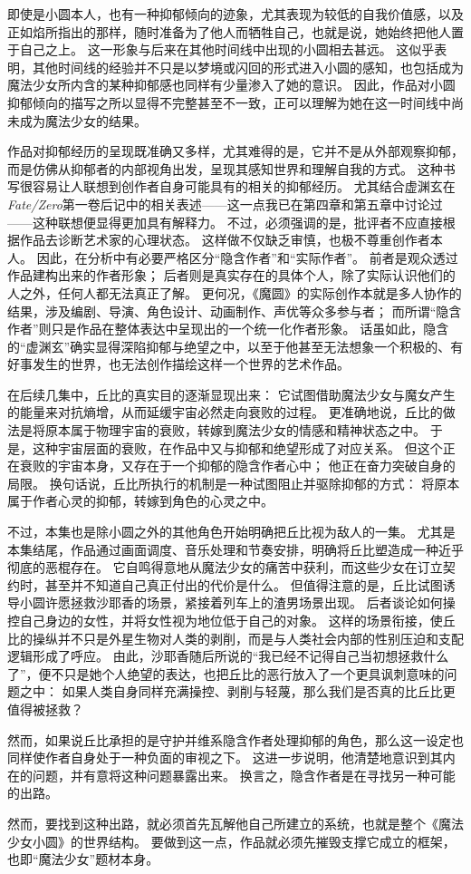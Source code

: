 即使是小圆本人，也有一种抑郁倾向的迹象，尤其表现为较低的自我价值感，以及正如焰所指出的那样，随时准备为了他人而牺牲自己，也就是说，她始终把他人置于自己之上。
这一形象与后来在其他时间线中出现的小圆相去甚远。
这似乎表明，其他时间线的经验并不只是以梦境或闪回的形式进入小圆的感知，也包括成为魔法少女所内含的某种抑郁感也同样有少量渗入了她的意识。
因此，作品对小圆抑郁倾向的描写之所以显得不完整甚至不一致，正可以理解为她在这一时间线中尚未成为魔法少女的结果。

作品对抑郁经历的呈现既准确又多样，尤其难得的是，它并不是从外部观察抑郁，而是仿佛从抑郁者的内部视角出发，呈现其感知世界和理解自我的方式。
这种书写很容易让人联想到创作者自身可能具有的相关的抑郁经历。
尤其结合虚渊玄在\emph{Fate/Zero}第一卷后记中的相关表述——这一点我已在第四章和第五章中讨论过——这种联想便显得更加具有解释力。
不过，必须强调的是，批评者不应直接根据作品去诊断艺术家的心理状态。
这样做不仅缺乏审慎，也极不尊重创作者本人。
因此，在分析中有必要严格区分“隐含作者”和“实际作者”。
前者是观众透过作品建构出来的作者形象；
后者则是真实存在的具体个人，除了实际认识他们的人之外，任何人都无法真正了解。
更何况，《魔圆》的实际创作本就是多人协作的结果，涉及编剧、导演、角色设计、动画制作、声优等众多参与者；
而所谓“隐含作者”则只是作品在整体表达中呈现出的一个统一化作者形象。
话虽如此，隐含的“虚渊玄”确实显得深陷抑郁与绝望之中，以至于他甚至无法想象一个积极的、有好事发生的世界，也无法创作描绘这样一个世界的艺术作品。

在后续几集中，丘比的真实目的逐渐显现出来：
它试图借助魔法少女与魔女产生的能量来对抗熵增，从而延缓宇宙必然走向衰败的过程。
更准确地说，丘比的做法是将原本属于物理宇宙的衰败，转嫁到魔法少女的情感和精神状态之中。
于是，这种宇宙层面的衰败，在作品中又与抑郁和绝望形成了对应关系。
但这个正在衰败的宇宙本身，又存在于一个抑郁的隐含作者心中；
他正在奋力突破自身的局限。
换句话说，丘比所执行的机制是一种试图阻止并驱除抑郁的方式：
将原本属于作者心灵的抑郁，转嫁到角色的心灵之中。

不过，本集也是除小圆之外的其他角色开始明确把丘比视为敌人的一集。
尤其是本集结尾，作品通过画面调度、音乐处理和节奏安排，明确将丘比塑造成一种近乎彻底的恶棍存在。
它自鸣得意地从魔法少女的痛苦中获利，而这些少女在订立契约时，甚至并不知道自己真正付出的代价是什么。
但值得注意的是，丘比试图诱导小圆许愿拯救沙耶香的场景，紧接着列车上的渣男场景出现。
后者谈论如何操控自己身边的女性，并将女性视为地位低于自己的对象。
这样的场景衔接，使丘比的操纵并不只是外星生物对人类的剥削，而是与人类社会内部的性别压迫和支配逻辑形成了呼应。
由此，沙耶香随后所说的“我已经不记得自己当初想拯救什么了”，便不只是她个人绝望的表达，也把丘比的恶行放入了一个更具讽刺意味的问题之中：
如果人类自身同样充满操控、剥削与轻蔑，那么我们是否真的比丘比更值得被拯救？

然而，如果说丘比承担的是守护并维系隐含作者处理抑郁的角色，那么这一设定也同样使作者自身处于一种负面的审视之下。
这进一步说明，他清楚地意识到其内在的问题，并有意将这种问题暴露出来。
换言之，隐含作者是在寻找另一种可能的出路。

然而，要找到这种出路，就必须首先瓦解他自己所建立的系统，也就是整个《魔法少女小圆》的世界结构。
要做到这一点，作品就必须先摧毁支撑它成立的框架，也即“魔法少女”题材本身。
